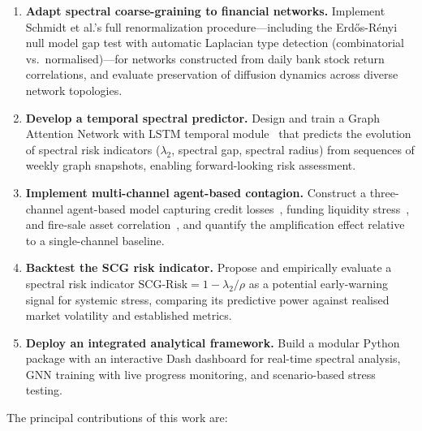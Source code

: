 \begin{enumerate}[label=\textbf{O\arabic*.}]
    \item \textbf{Adapt spectral coarse-graining to financial networks.}
    Implement Schmidt et al.'s full renormalization procedure---including
    the Erd\H{o}s-R\'enyi null model gap test with automatic Laplacian
    type detection (combinatorial vs.\ normalised)---for networks
    constructed from daily bank stock return correlations, and evaluate
    preservation of diffusion dynamics across diverse network topologies.

    \item \textbf{Develop a temporal spectral predictor.}  Design and
    train a Graph Attention Network with LSTM temporal
    module~\cite{velickovic2018graph} that predicts the evolution of
    spectral risk indicators ($\lambda_2$, spectral gap, spectral radius)
    from sequences of weekly graph snapshots, enabling forward-looking
    risk assessment.

    \item \textbf{Implement multi-channel agent-based contagion.}
    Construct a three-channel agent-based model capturing credit
    losses~\cite{nier2007network}, funding liquidity
    stress~\cite{gai2010contagion}, and fire-sale asset
    correlation~\cite{caccioli2015overlapping}, and quantify the
    amplification effect relative to a single-channel baseline.

    \item \textbf{Backtest the SCG risk indicator.}  Propose and
    empirically evaluate a spectral risk indicator
    $\text{SCG-Risk} = 1 - \lambda_2/\rho$ as a potential early-warning
    signal for systemic stress, comparing its predictive power against
    realised market volatility and established metrics.

    \item \textbf{Deploy an integrated analytical framework.}  Build a
    modular Python package with an interactive Dash dashboard for
    real-time spectral analysis, GNN training with live progress
    monitoring, and scenario-based stress testing.
\end{enumerate}

The principal contributions of this work are:

